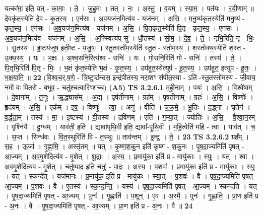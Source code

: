 \documentclass[17pt]{extarticle}
\begin{document}
                  यत्का॑मा॒ इति॒ यत् - का॒माः॒ । ते॒ । जु॒हु॒मः । तत् । नः॒ । अ॒स्तु॒ । व॒यम् । स्या॒म॒ । पत॑यः । र॒यी॒णाम् ॥ दे॒वकृ॑त॒स्येति॑ दे॒व - कृ॒त॒स्य॒ । एन॑सः । अ॒व॒यज॑न॒मित्य॑व - यज॑नम् । अ॒सि॒ । म॒नु॒ष्य॑कृत॒स्येति॑ मनु॒ष्य॑ - कृ॒त॒स्य॒ । एन॑सः । अ॒व॒यज॑न॒मित्य॑व - यज॑नम् । अ॒सि॒ । पि॒तृकृ॑त॒स्येति॑ पि॒तृ - कृ॒त॒स्य॒ । एन॑सः । अ॒व॒यज॑न॒मित्य॑व - यज॑नम् । अ॒सि॒ । अ॒फ्स्वित्य॑प्-सु । धौ॒तस्य॑ । सो॒म॒ । दे॒व॒ । ते॒ । नृभि॒रिति॒ नृ - भिः॒ । सु॒तस्य॑ । इ॒ष्टय॑जुष॒ इती॒ष्ट - य॒जु॒षः॒ । स्तु॒तस्तो॑म॒स्येति॑ स्तु॒त - स्तो॒म॒स्य॒ । श॒स्तोक्थ॒स्येति॑ श॒स्त - उ॒क्थ॒स्य॒ । यः । भ॒क्षः । अ॒श्व॒सनि॒रित्य॑श्व - सनिः॑ । यः । गो॒सनि॒रिति॑ गो - सनिः॑ । तस्य॑ । ते॒ । पि॒तृभि॒रिति॑ पि॒तृ - भिः॒ । भ॒क्षं कृ॑त॒स्येति॑ भ॒क्षं - कृ॒त॒स्य॒ । उप॑हूत॒स्येत्युप॑ - हू॒त॒स्य॒ । उप॑हूत॒ इत्युप॑ - हू॒तः॒ । भ॒क्ष॒या॒मि॒ ॥ \textbf{  22} \newline
                  \newline
                      (वि॒श्व॒च॒र्.ष॒णे॒ - त्रि॒ष्टुप्छ॑न्दस॒ इन्द्र॑पीतस्य॒ नरा॒शꣳ स॑पीत॒स्या - ऽति॑ -स्तु॒तस्तो॑मस्य - जी॒वाय॒ नमो॑ वः पितरो - बभूव॒ - चतु॑श्चत्वारिꣳशच्च)  \textbf{(A5)} \newline \newline
                                \textbf{ TS 3.2.6.1} \newline
                  म॒ही॒नाम् । पयः॑ । अ॒सि॒ । विश्वे॑षाम् । दे॒वाना᳚म् । त॒नूः । ऋ॒द्ध्यास᳚म् । अ॒द्य । पृष॑तीनाम् । ग्रह᳚म् । पृष॑तीनाम् । ग्रहः॑ । अ॒सि॒ । विष्णोः᳚ । हृद॑यम् । अ॒सि॒ । एक᳚म् । इ॒ष॒ । विष्णुः॑ । त्वा॒ । अनु॑ । वीति॑ । च॒क्र॒मे॒ । भू॒तिः । द॒द्ध्ना । घृ॒तेन॑ । व॒र्द्ध॒ता॒म् । तस्य॑ । मा॒ । इ॒ष्टस्य॑ । वी॒तस्य॑ । द्रवि॑णम् । एति॑ । ग॒म्या॒त् । ज्योतिः॑ । अ॒सि॒ । वै॒श्वा॒न॒रम् । पृश्नि॑यै । दु॒ग्धम् । याव॑ती॒ इति॑ । द्यावा॑पृथि॒वी इति॒ द्यावा᳚-पृ॒थि॒वी । म॒हि॒त्वेति॑ महि - त्वा । याव॑त् । च॒ । स॒प्त । सिन्ध॑वः । वि॒त॒स्थुरिति॑ वि - त॒स्थुः ॥ ताव॑न्तम् । इ॒न्द्र॒ । ते॒ । \textbf{  23} \newline
                  \newline
                                \textbf{ TS 3.2.6.2} \newline
                  ग्रह᳚म् । स॒ह । ऊ॒र्जा । गृ॒ह्णा॒मि॒ । अस्तृ॑तम् ॥ यत् । कृ॒ष्ण॒श॒कु॒न इति॑ कृष्ण - श॒कु॒नः । पृ॒ष॒दा॒ज्यमिति॑ पृषत् - आ॒ज्यम् । अ॒व॒मृ॒शेदित्य॑व - मृ॒शेत् । शू॒द्राः । अ॒स्य॒ । प्र॒मायु॑का॒ इति॑ प्र - मायु॑काः । स्युः॒ । यत् । श्वा । अ॒व॒मृ॒शेदित्य॑व - मृ॒शेत् । चतु॑ष्पाद॒ इति॒ चतुः॑ - पा॒दः॒ । अ॒स्य॒ । प॒शवः॑ । प्र॒मायु॑का॒ इति॑ प्र - मायु॑काः । स्युः॒ । यत् । स्कन्दे᳚त् । यज॑मानः । प्र॒मायु॑क॒ इति॑ प्र - मायु॑कः । स्या॒त् । प॒शवः॑ । वै । पृ॒ष॒दा॒ज्यमिति॑ पृषत्-आ॒ज्यम् । प॒शवः॑ । वै । ए॒तस्य॑ । स्क॒न्द॒न्ति॒ । यस्य॑ । पृ॒ष॒दा॒ज्यमिति॑ पृषत् - आ॒ज्यम् । स्कन्द॑ति । यत् । पृ॒ष॒दा॒ज्यमिति॑ पृषत् - आ॒ज्यम् । पुनः॑ । गृ॒ह्णाति॑ । प॒शून् । ए॒व । अ॒स्मै॒ । पुनः॑ । गृ॒ह्णा॒ति॒ । प्रा॒ण इति॑ प्र - अ॒नः । वै । पृ॒ष॒दा॒ज्यमिति॑ पृषत् - आ॒ज्यम् । प्रा॒ण इति॑ प्र - अ॒नः । वै ॥ \textbf{  24} \newline
\end{document}
